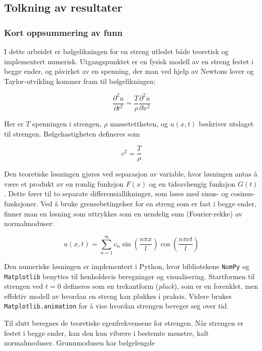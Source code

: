 \subsection{Tolkning av resultater}
\subsubsection{Kort oppsummering av funn}
I dette arbeidet er bølgelikningen for en streng utledet både teoretisk og implementert numerisk. Utgangspunktet er en fysisk modell av en streng festet i begge ender, og påvirket av en spenning, der man ved hjelp av Newtons lover og Taylor-utvikling kommer fram til bølgelikningen:

\begin{equation*}
\frac{\partial^2 u}{\partial t^2} = \frac{T}{\rho} \frac{\partial^2 u}{\partial x^2}
\end{equation*}

Her er \( T \) spenningen i strengen, \( \rho \) massetettheten, og \( u(x, t) \) beskriver utslaget til strengen. Bølgehastigheten defineres som

\begin{equation*}
c^2 = \frac{T}{\rho}
\end{equation*}

Den teoretiske løsningen gjøres ved separasjon av variable, hvor løsningen antas å være et produkt av en romlig funksjon \( F(x) \) og en tidsavhengig funksjon \( G(t) \). Dette fører til to separate differensiallikninger, som løses med sinus- og cosinus-funksjoner. Ved å bruke grensebetingelser for en streng som er fast i begge ender, finner man en løsning som uttrykkes som en uendelig sum (Fourier-rekke) av normalmoduser:

\begin{equation*}
u(x, t) = \sum_{n=1}^{\infty} c_n \sin\left(\frac{n\pi x}{l}\right)\cos\left(\frac{n\pi c t}{l}\right)
\end{equation*}

Den numeriske løsningen er implementert i Python, hvor bibliotekene \texttt{NumPy} og \texttt{Matplotlib} benyttes til henholdsvis beregninger og visualisering. Startformen til strengen ved \( t = 0 \) defineres som en trekantform (\textit{pluck}), som er en forenklet, men effektiv modell av hvordan en streng kan plukkes i praksis. Videre brukes \texttt{Matplotlib.animation} for å vise hvordan strengen beveger seg over tid.

Til slutt beregnes de teoretiske egenfrekvensene for strengen. Når strengen er festet i begge ender, kan den kun vibrere i bestemte mønstre, kalt normalmoduser. Grunnmodusen har bølgelengde

